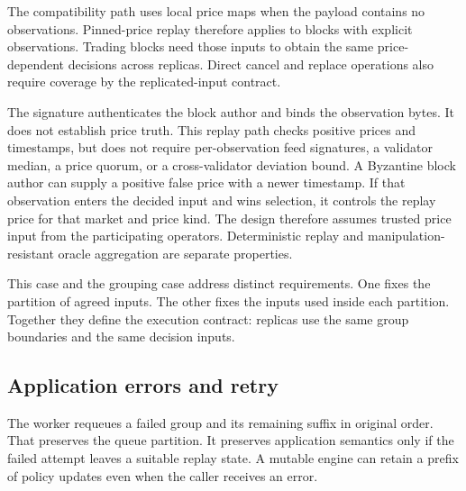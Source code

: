 \documentclass[11pt]{article}
\begin{document}
The compatibility path uses local price maps when the payload contains no observations. Pinned-price replay therefore applies to blocks with explicit observations. Trading blocks need those inputs to obtain the same price-dependent decisions across replicas. Direct cancel and replace operations also require coverage by the replicated-input contract. \cite{R12,R16}

The signature authenticates the block author and binds the observation bytes. It does not establish price truth. This replay path checks positive prices and timestamps, but does not require per-observation feed signatures, a validator median, a price quorum, or a cross-validator deviation bound. A Byzantine block author can supply a positive false price with a newer timestamp. If that observation enters the decided input and wins selection, it controls the replay price for that market and price kind. The design therefore assumes trusted price input from the participating operators. Deterministic replay and manipulation-resistant oracle aggregation are separate properties. \cite{R12}

This case and the grouping case address distinct requirements. One fixes the partition of agreed inputs. The other fixes the inputs used inside each partition. Together they define the execution contract: replicas use the same group boundaries and the same decision inputs.

\subsection{Application errors and retry}
The worker requeues a failed group and its remaining suffix in original order. That preserves the queue partition. It preserves application semantics only if the failed attempt leaves a suitable replay state. A mutable engine can retain a prefix of policy updates even when the caller receives an error. \cite{R29}
\end{document}
